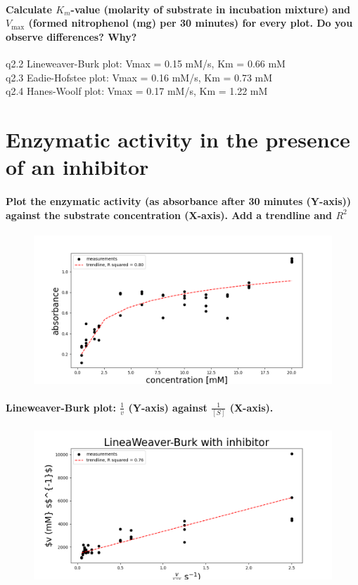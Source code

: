 \documentclass[a4paper,12pt]{article}
\begin{document}
\paragraph{Calculate $K_m$-value (molarity of substrate in incubation mixture) and $V_{\text{max}}$ (formed nitrophenol (mg) per 30 minutes) for every plot. Do you observe 
differences? Why? 
}

q2.2 Lineweaver-Burk plot: Vmax = 0.15 mM/s, Km = 0.66 mM\\
q2.3 Eadie-Hofstee plot: Vmax = 0.16 mM/s, Km = 0.73 mM\\
q2.4 Hanes-Woolf plot: Vmax = 0.17 mM/s, Km = 1.22 mM\\

\section{Enzymatic activity in the presence of an inhibitor}

\paragraph{Plot the enzymatic activity (as absorbance after 30 minutes (Y-axis)) 
against the substrate concentration (X-axis). Add a trendline and $R^2$}

\begin{figure}[h]
    \includegraphics[scale=0.4]{fig3_1.png}
    \centering
\end{figure}

\paragraph{Lineweaver-Burk plot: $\frac{1}{v}$ (Y-axis) against $\frac{1}{[S]}$ (X-axis).}

\begin{figure}[h]
    \includegraphics[scale=0.4]{fig3_2.png}
    \centering
\end{figure}
\end{document}
